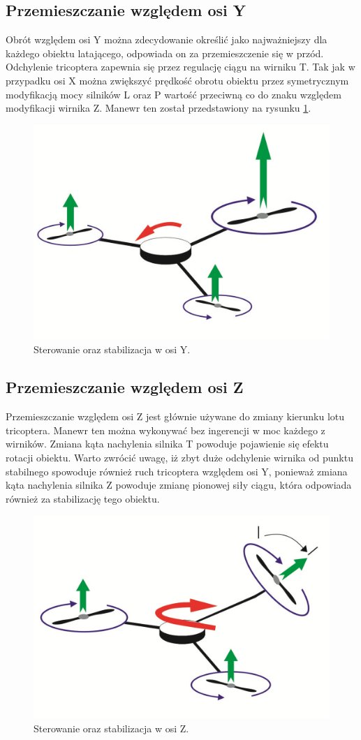 \subsection{Przemieszczanie względem osi Y}
Obrót względem osi Y można zdecydowanie określić jako najważniejszy dla każdego obiektu latającego, odpowiada on za przemieszczenie się w przód. Odchylenie tricoptera zapewnia się przez regulację ciągu na wirniku T. Tak jak w przypadku osi X można zwiększyć prędkość obrotu obiektu przez symetrycznym modyfikacją mocy silników L oraz P wartość przeciwną co do znaku względem modyfikacji wirnika Z. Manewr ten został przedstawiony na rysunku \ref{fig:axis_y}.
\begin{figure}[!htbp]
\centering
\includegraphics[width=0.7\linewidth]{./include/axis_y}
\caption{Sterowanie oraz stabilizacja w osi Y.}
\label{fig:axis_y}
\end{figure}


\subsection{Przemieszczanie względem osi Z}
Przemieszczanie względem osi Z jest głównie używane do zmiany kierunku lotu tricoptera. Manewr ten można wykonywać bez ingerencji w moc każdego z wirników. Zmiana kąta nachylenia silnika T powoduje pojawienie się efektu rotacji obiektu. Warto zwrócić uwagę, iż zbyt duże odchylenie wirnika od punktu stabilnego spowoduje również ruch tricoptera względem osi Y, ponieważ zmiana kąta nachylenia silnika Z powoduje zmianę pionowej siły ciągu, która odpowiada również za stabilizację tego obiektu. 

\begin{figure}[!htbp]
\centering
\includegraphics[width=0.7\linewidth]{./include/axis_z}
\caption{Sterowanie oraz stabilizacja w osi Z.}
\label{fig:axis_z}
\end{figure}


